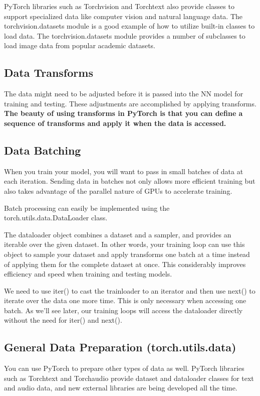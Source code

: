 PyTorch libraries such as Torchvision and Torchtext also provide classes to support specialized data like computer vision
and natural language data. The torchvision.datasets module
is a good example of how to utilize built-in classes to load data.
The torchvision.datasets module provides a number of subclasses to load image data from popular academic datasets.

\subsection{Data Transforms}
The data might need to be adjusted
before it is passed into the NN model for training and testing. These adjustments are accomplished by applying transforms. \textbf{The beauty of using transforms in PyTorch is that you can define a sequence of transforms and apply it when the data is accessed.}


\subsection{Data Batching}
When you train your model, you will want to pass in small batches of data at each iteration. Sending data in batches not only allows more efficient training but also takes advantage of the parallel nature of
GPUs to accelerate training.

Batch processing can easily be implemented using the \textsf{torch.utils.data.DataLoader} class.

The dataloader object combines a dataset and a sampler, and
provides an iterable over the given dataset. In other words,
your training loop can use this object to sample your dataset
and apply transforms one batch at a time instead of applying
them for the complete dataset at once. This considerably
improves efficiency and speed when training and testing
models.

We need to use iter() to cast the trainloader to an iterator
and then use next() to iterate over the data one more time.
This is only necessary when accessing one batch. As we’ll see
later, our training loops will access the dataloader directly
without the need for iter() and next().

\subsection{General Data Preparation (torch.utils.data)}
You can use PyTorch to prepare other types of data as well. PyTorch libraries such as Torchtext and Torchaudio provide dataset and dataloader
classes for text and audio data, and new external libraries are
being developed all the time.

